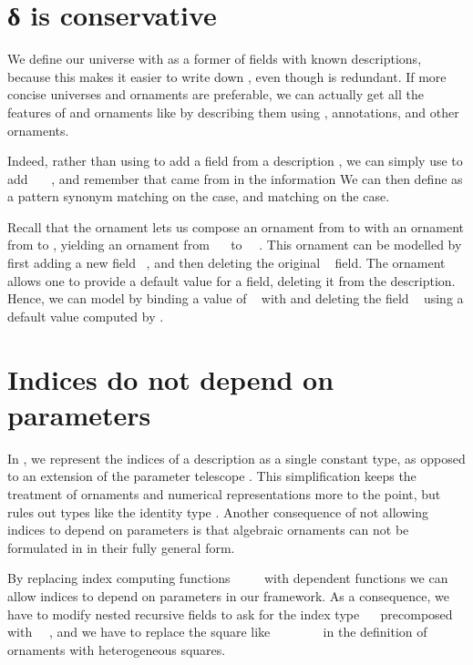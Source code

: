 \section{δ is conservative}\label{sec:redundant-delta}
We define our universe  with  as a former of fields with known descriptions, because this makes it easier to write down , even though  is redundant. If more concise universes and ornaments are preferable, we can actually get all the features of  and ornaments like  by describing them using , annotations, and other ornaments.

Indeed, rather than using  to add a field from a description , we can simply use  to add \ \AV{=}\ \ , and remember that  came from  in the information
We can then define  as a pattern synonym matching on the  case, and  matching on the  case.

Recall that the ornament  lets us compose an ornament from  to  with an ornament from  to , yielding an ornament from \ \  to \ \ . This ornament can be modelled by first adding a new field \ , and then deleting the original \  field. The ornament  \cite{kophd} allows one to provide a default value for a field, deleting it from the description. Hence, we can model  by binding a value  of \  with  and deleting the field \  using a default value computed by .


\section{Indices do not depend on parameters}\label{sec:no-dep-ix}
In , we represent the indices of a description as a single constant type, as opposed to an extension of the parameter telescope \cite{practgen}. This simplification keeps the treatment of ornaments and numerical representations more to the point, but rules out types like the identity type . Another consequence of not allowing indices to depend on parameters is that algebraic ornaments \cite{algorn} can not be formulated in  in their fully general form.

By replacing index computing functions \ \AF{\&}\ \ \  with dependent functions
we can allow indices to depend on parameters in our framework. As a consequence, we have to modify nested recursive fields to ask for the index type \ \  precomposed with \ \ , and we have to replace the square like \ \ \ \ \ \ \  in the definition of ornaments with heterogeneous squares.


